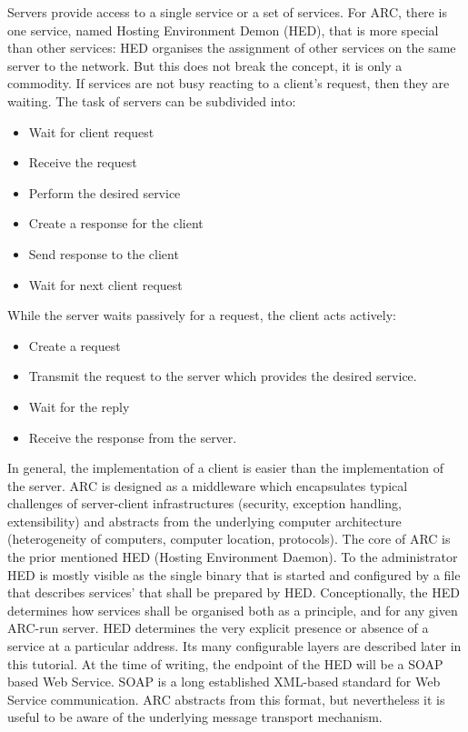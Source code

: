Servers provide access to a single service or a set of services. For ARC, there is one service, named Hosting Environment Demon (HED), that is more special than other services: HED organises the assignment of other services on the same server to the network. But this does not break the concept, it is only a commodity. If services are not busy reacting to a client's request, then they are waiting. The task of servers can be subdivided into:
\begin{itemize}
 \item Wait for client request
 \item Receive the request
 \item Perform the desired service
 \item Create a response for the client
 \item Send response to the client
 \item Wait for next client request
\end{itemize}
While the server waits passively for a request, the client acts actively:
\begin{itemize}
 \item Create a request
 \item Transmit the request to the server which provides the desired service.
 \item Wait for the reply
 \item Receive the response from the server.
 \end{itemize}
\forcelinebreak

In general, the implementation of a client is easier than the implementation of the server. 
ARC is designed as a middleware which encapsulates typical challenges of server-client infrastructures (security, exception handling, extensibility) and abstracts from the underlying computer architecture (heterogeneity of computers, computer location, protocols).
The core of ARC is the prior mentioned HED (Hosting Environment Daemon).
To the administrator HED is mostly visible as the single binary that is started and configured by a file that describes services' that shall be prepared by HED. 
Conceptionally, the HED determines how services shall be organised both as a principle, and for any given ARC-run server.
HED determines the very explicit presence or absence of a service at a particular address. Its many configurable layers are described later in this tutorial. 
%
At the time of writing, the endpoint of the HED will be a SOAP based  Web Service.
SOAP is a long established XML-based standard for Web Service communication.
ARC abstracts from this format, but nevertheless it is useful to be aware of
the underlying message transport mechanism.

